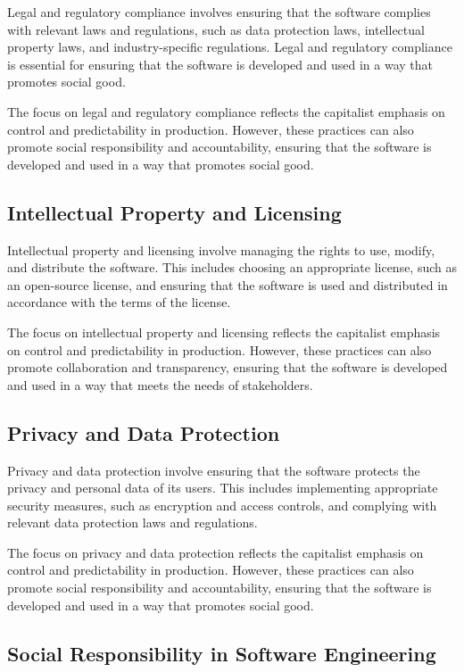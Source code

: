 \begin{refsection}
\begin{multicols}{2}
{Legal and regulatory compliance involves ensuring that the software complies with relevant laws and regulations, such as data protection laws, intellectual property laws, and industry-specific regulations. Legal and regulatory compliance is essential for ensuring that the software is developed and used in a way that promotes social good.

The focus on legal and regulatory compliance reflects the capitalist emphasis on control and predictability in production. However, these practices can also promote social responsibility and accountability, ensuring that the software is developed and used in a way that promotes social good.

\subsection{Intellectual Property and Licensing}

Intellectual property and licensing involve managing the rights to use, modify, and distribute the software. This includes choosing an appropriate license, such as an open-source license, and ensuring that the software is used and distributed in accordance with the terms of the license.

The focus on intellectual property and licensing reflects the capitalist emphasis on control and predictability in production. However, these practices can also promote collaboration and transparency, ensuring that the software is developed and used in a way that meets the needs of stakeholders.

\subsection{Privacy and Data Protection}

Privacy and data protection involve ensuring that the software protects the privacy and personal data of its users. This includes implementing appropriate security measures, such as encryption and access controls, and complying with relevant data protection laws and regulations.

The focus on privacy and data protection reflects the capitalist emphasis on control and predictability in production. However, these practices can also promote social responsibility and accountability, ensuring that the software is developed and used in a way that promotes social good.

\subsection{Social Responsibility in Software Engineering}

}
\end{multicols}
\end{refsection}
